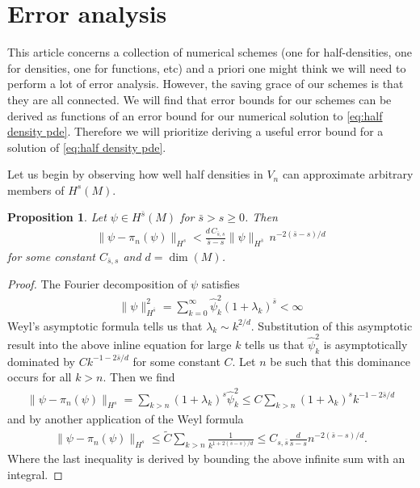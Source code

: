 \documentclass[12pt]{amsart}
\newtheorem{prop}[thm]{Proposition}
\begin{document}
\section{Error analysis}

This article concerns a collection of numerical schemes (one for half-densities, one for densities, one for functions, etc) and a priori one might think we will need to perform a lot of error analysis.
However, the saving grace of our schemes is that they are all connected.  We will find that error bounds for our schemes can be derived as functions of an error bound
for our numerical solution to \eqref{eq:half density pde}.  Therefore we will prioritize deriving a useful error bound for a solution
of \eqref{eq:half density pde}.

Let us begin by observing how well half densities in $V_{n}$ can approximate arbitrary members of $H^{s}(M)$.

\begin{prop} \label{prop:approximation}
	Let $\psi \in H^{\bar{s}}(M)$ for $\bar{s} > s \geq 0$.
	Then
	\begin{align*}
		\| \psi - \pi_{n}(\psi) \|_{H^{s}} <  \frac{d \, C_{\bar{s},s} }{ \bar{s}-s} \| \psi \|_{H^{\bar{s}}} \, n^{-2(\bar{s}-s)/d}
	\end{align*}
	for some constant $C_{\bar{s},s}$ and $d = \dim(M)$.
\end{prop}
\begin{proof}
	The Fourier decomposition of $\psi$ satisfies
	\begin{align*}
		\| \psi \|^{2}_{H^{\bar{s} }} = \sum_{k=0}^{\infty} \hat{\psi}_{k}^{2} (1+\lambda_{k})^{\bar{s}} < \infty
	\end{align*}
	Weyl's asymptotic formula tells us that $\lambda_{k} \sim k^{2/d}$.
	Substitution of this asymptotic result into the above inline equation for large $k$ tells us that $\hat{\psi}_{k}^{2}$ is asymptotically dominated by  $C k^{-1- 2\bar{s}/d}$
	for some constant $C$.
	Let $n$ be such that this dominance occurs for all $k>n$.  Then we find
	\begin{align*}
		\| \psi - \pi_{n}(\psi) \|_{H^{s}} = \sum_{k>n} (1+\lambda_{k})^{s} \hat{\psi}_{k}^{2} \leq C \sum_{k>n} (1+\lambda_{k})^{s} k^{-1- 2\bar{s}/d}
	\end{align*}
	and by another application of the Weyl formula
	\begin{align*}
		\| \psi - \pi_{n}(\psi) \|_{H^{s}} \leq \tilde{C} \sum_{k>n} \frac{1}{k^{1+2(\bar{s}-s)/d}} \leq C_{s,\bar{s}}  \frac{d }{ \bar{s}-s} n^{-2(\bar{s}-s)/d}.
	\end{align*}
	Where the last inequality is derived by bounding the above infinite sum with an integral.
\end{proof}
\end{document}
